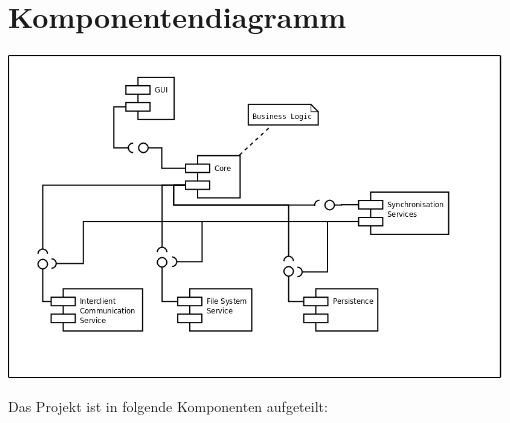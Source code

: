 \section{Komponentendiagramm}

\includegraphics[width=0.98\textwidth]{../../uml/component_diagram.png}

Das Projekt ist in folgende Komponenten aufgeteilt:






